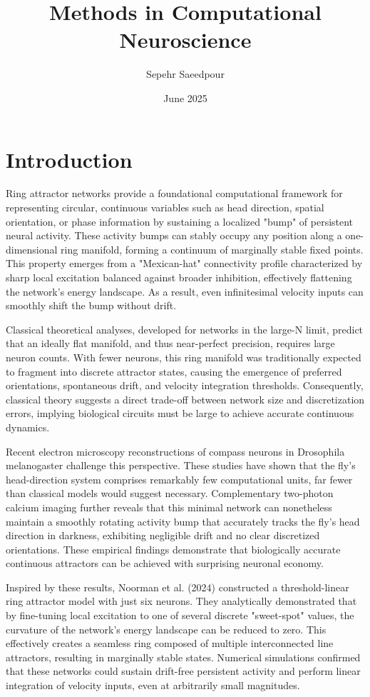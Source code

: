 \documentclass[11pt,a4paper]{article}
\title{Methods in Computational Neuroscience\\
[Your Project Title]}
\author{Sepehr Saeedpour}
\date{June 2025}
\begin{document}
\maketitle

\section*{Introduction}
Ring attractor networks provide a foundational computational framework for representing circular, continuous variables such as head direction, spatial orientation, or phase information by sustaining a localized "bump" of persistent neural activity. These activity bumps can stably occupy any position along a one-dimensional ring manifold, forming a continuum of marginally stable fixed points. This property emerges from a "Mexican-hat" connectivity profile characterized by sharp local excitation balanced against broader inhibition, effectively flattening the network's energy landscape. As a result, even infinitesimal velocity inputs can smoothly shift the bump without drift.

Classical theoretical analyses, developed for networks in the large-N limit, predict that an ideally flat manifold, and thus near-perfect precision, requires large neuron counts. With fewer neurons, this ring manifold was traditionally expected to fragment into discrete attractor states, causing the emergence of preferred orientations, spontaneous drift, and velocity integration thresholds. Consequently, classical theory suggests a direct trade-off between network size and discretization errors, implying biological circuits must be large to achieve accurate continuous dynamics.

Recent electron microscopy reconstructions of compass neurons in Drosophila melanogaster challenge this perspective. These studies have shown that the fly's head-direction system comprises remarkably few computational units, far fewer than classical models would suggest necessary. Complementary two-photon calcium imaging further reveals that this minimal network can nonetheless maintain a smoothly rotating activity bump that accurately tracks the fly’s head direction in darkness, exhibiting negligible drift and no clear discretized orientations. These empirical findings demonstrate that biologically accurate continuous attractors can be achieved with surprising neuronal economy.

Inspired by these results, Noorman et al. (2024) constructed a threshold-linear ring attractor model with just six neurons. They analytically demonstrated that by fine-tuning local excitation to one of several discrete "sweet-spot" values, the curvature of the network’s energy landscape can be reduced to zero. This effectively creates a seamless ring composed of multiple interconnected line attractors, resulting in marginally stable states. Numerical simulations confirmed that these networks could sustain drift-free persistent activity and perform linear integration of velocity inputs, even at arbitrarily small magnitudes.
\end{document}
